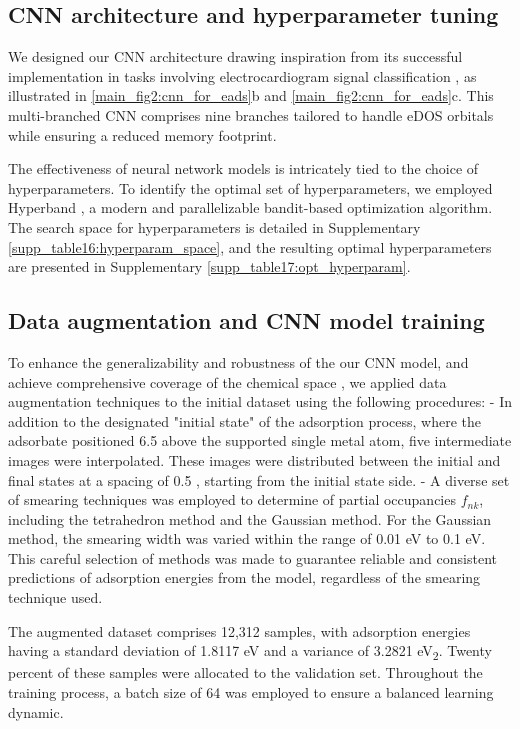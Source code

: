 \subsection{CNN architecture and hyperparameter tuning}
We designed our CNN architecture drawing inspiration from its successful implementation in tasks involving electrocardiogram signal classification \cite{weimann2021transfer}, as illustrated in \cref{main_fig2:cnn_for_eads}b and \cref{main_fig2:cnn_for_eads}c.
This multi-branched CNN comprises nine branches tailored to handle eDOS orbitals while ensuring a reduced memory footprint.

The effectiveness of neural network models is intricately tied to the choice of hyperparameters.
To identify the optimal set of hyperparameters, we employed Hyperband \cite{li2018hyperband}, a modern and parallelizable bandit-based optimization algorithm.
The search space for hyperparameters is detailed in Supplementary \cref{supp_table16:hyperparam_space}, and the resulting optimal hyperparameters are presented in Supplementary \cref{supp_table17:opt_hyperparam}.

\subsection{Data augmentation and CNN model training}
To enhance the generalizability and robustness of the our CNN model, and achieve comprehensive coverage of the chemical space \cite{DBLP:journals/corr/abs-2112-12542}, we applied data augmentation techniques to the initial dataset using the following procedures:
	- In addition to the designated "initial state" of the adsorption process, where the adsorbate positioned 6.5 \text{\AA} above the supported single metal atom, five intermediate images were interpolated. These images were distributed between the initial and final states at a spacing of 0.5 \text{\AA}, starting from the initial state side.
	- A diverse set of smearing techniques was employed to determine of partial occupancies $f_{nk}$, including the tetrahedron method \cite{blochl1994improved} and the Gaussian method. For the Gaussian method, the smearing width was varied within the range of 0.01 eV to 0.1 eV. This careful selection of methods was made to guarantee reliable and consistent predictions of adsorption energies from the model, regardless of the smearing technique used.

The augmented dataset comprises 12,312 samples, with adsorption energies having a standard deviation of 1.8117 eV and a variance of 3.2821 eV\textsubscript{2}.
Twenty percent of these samples were allocated to the validation set. Throughout the training process, a batch size of 64 was employed to ensure a balanced learning dynamic.

